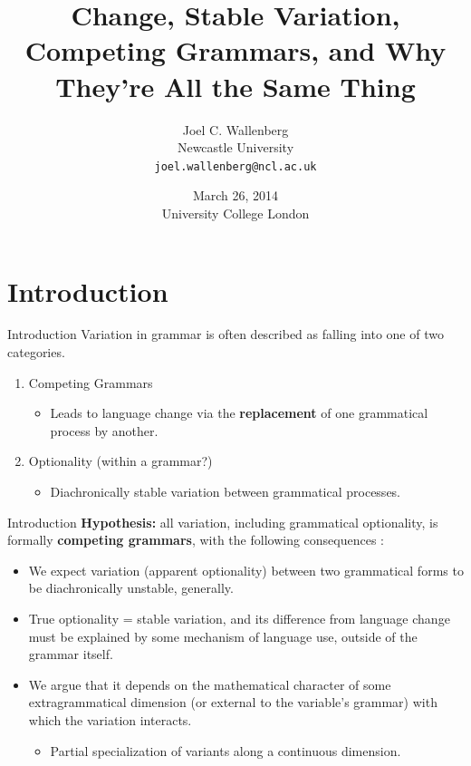 \documentclass[hyperref={pdfpagelabels=false}]{beamer}
\title{Change, Stable Variation, Competing Grammars, and Why They're All the Same Thing}
\author{Joel C. Wallenberg\\Newcastle University\\\texttt{joel.wallenberg@ncl.ac.uk}}
\institute{}
\date[]{March 26, 2014 \\ University College London}
\begin{document}
\begin{frame}[plain]
\titlepage
\end{frame}


\section{Introduction}
\begin{frame}{Introduction}
	Variation in grammar is often described as falling into one of two categories.
	
	\begin{enumerate}
		\item Competing Grammars
		\begin{itemize}
			\item Leads to language change via the \textbf{replacement} of one grammatical process by another.
		\end{itemize}
		\item Optionality (within a grammar?)
		\begin{itemize}
			\item Diachronically stable variation between grammatical processes.
		\end{itemize}
	\end{enumerate}
	
\end{frame}

\begin{frame}{Introduction}
	\textbf{Hypothesis:} all variation, including grammatical optionality, is formally \textbf{competing grammars}, with the following consequences \citep{fruehwaldwallenberg2013}:
	\begin{itemize}
		\item We expect variation (apparent optionality) between two grammatical forms to be diachronically unstable, generally.
		\item True optionality = stable variation, and its difference from language change must be explained by some mechanism of language use, outside of the grammar itself. 
		\item We argue that it depends on the mathematical character of some extragrammatical dimension (or external to the variable's grammar) with which the variation interacts.
			\begin{itemize} \item Partial specialization of variants along a continuous dimension. \end{itemize}
	\end{itemize}

\end{frame}
\end{document}

